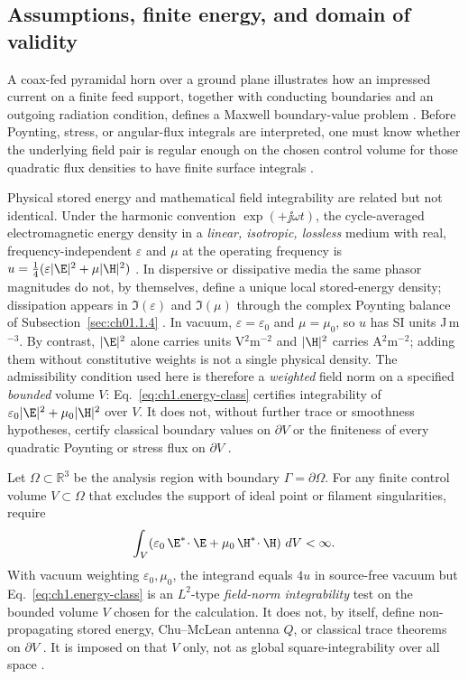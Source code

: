 \subsection{Assumptions, finite energy, and domain of validity}
\label{sec:ch01.0.3}

A coax-fed pyramidal horn over a ground plane illustrates how an impressed current on a finite feed support, together with conducting boundaries and an outgoing radiation condition, defines a Maxwell boundary-value problem \cite{stratton1941}. Before Poynting, stress, or angular-flux integrals are interpreted, one must know whether the underlying field pair is regular enough on the chosen control volume for those quadratic flux densities to have finite surface integrals \cite{maxwell1873,poynting1884,stratton1941}.

Physical stored energy and mathematical field integrability are related but not identical. Under the harmonic convention \(\exp(+\jj\omega t)\), the cycle-averaged electromagnetic energy density in a \emph{linear, isotropic, lossless} medium with real, frequency-independent \(\varepsilon\) and \(\mu\) at the operating frequency is \(u=\tfrac14(\varepsilon|\E|^{2}+\mu|\H|^{2})\) \cite{stratton1941}. In dispersive or dissipative media the same phasor magnitudes do not, by themselves, define a unique local stored-energy density; dissipation appears in \(\Im(\varepsilon)\) and \(\Im(\mu)\) through the complex Poynting balance of Subsection~\ref{sec:ch01.1.4} \cite{stratton1941,harrington2001}. In vacuum, \(\varepsilon=\varepsilon_0\) and \(\mu=\mu_0\), so \(u\) has SI units J\,m\(^{-3}\). By contrast, \(|\E|^{2}\) alone carries units V\(^2\)m\(^{-2}\) and \(|\H|^{2}\) carries A\(^2\)m\(^{-2}\); adding them without constitutive weights is not a single physical density. The admissibility condition used here is therefore a \emph{weighted} field norm on a specified \emph{bounded} volume \(V\): Eq.~\eqref{eq:ch1.energy-class} certifies integrability of \(\varepsilon_0|\E|^{2}+\mu_0|\H|^{2}\) over \(V\). It does not, without further trace or smoothness hypotheses, certify classical boundary values on \(\partial V\) or the finiteness of every quadratic Poynting or stress flux on \(\partial V\) \cite{stratton1941}.

Let \(\Omega\subset\mathbb{R}^{3}\) be the analysis region with boundary \(\Gamma=\partial\Omega\). For any finite control volume \(V\subset\Omega\) that excludes the support of ideal point or filament singularities, require
\begin{equation}
\label{eq:ch1.energy-class}
\int_{V}\!\left(\varepsilon_0\,\E^*\!\cdot\E+\mu_0\,\H^*\!\cdot\H\right)\,dV<\infty.
\end{equation}
With vacuum weighting \(\varepsilon_0,\mu_0\), the integrand equals \(4u\) in source-free vacuum but Eq.~\eqref{eq:ch1.energy-class} is an \(L^2\)-type \emph{field-norm integrability} test on the bounded volume \(V\) chosen for the calculation. It does not, by itself, define non-propagating stored energy, Chu--McLean antenna \(Q\), or classical trace theorems on \(\partial V\) \cite{stratton1941,harrington2001}. It is imposed on that \(V\) only, not as global square-integrability over all space \cite{stratton1941}.

